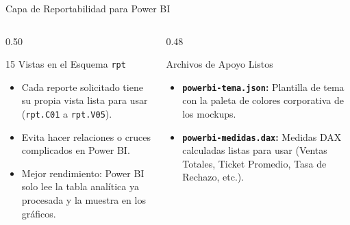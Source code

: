 \documentclass[aspectratio=169, 10pt]{beamer}
\begin{document}
\begin{frame}{Capa de Reportabilidad para Power BI}
    \begin{columns}[c]
        \begin{column}{0.50\textwidth}
            \begin{block}{15 Vistas en el Esquema \texttt{rpt}}
                \small
                \begin{itemize}
                    \item Cada reporte solicitado tiene su propia vista lista para usar (\texttt{rpt.C01} a \texttt{rpt.V05}).
                    \item Evita hacer relaciones o cruces complicados en Power BI.
                    \item Mejor rendimiento: Power BI solo lee la tabla analítica ya procesada y la muestra en los gráficos.
                \end{itemize}
            \end{block}
        \end{column}
        
        \begin{column}{0.48\textwidth}
            \begin{block}{Archivos de Apoyo Listos}
                \small
                \begin{itemize}
                    \item \textbf{\texttt{powerbi-tema.json}:} Plantilla de tema con la paleta de colores corporativa de los mockups.
                    \item \textbf{\texttt{powerbi-medidas.dax}:} Medidas DAX calculadas listas para usar (Ventas Totales, Ticket Promedio, Tasa de Rechazo, etc.).
                \end{itemize}
            \end{block}
        \end{column}
    \end{columns}
\end{frame}
\end{document}
